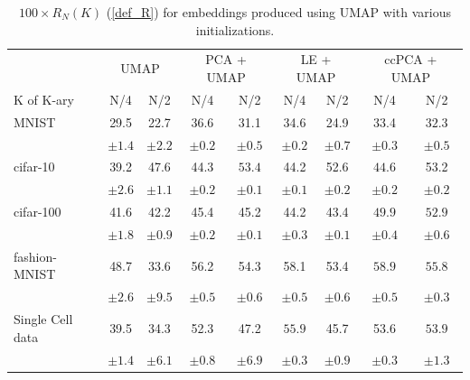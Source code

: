 \begin{table}[h]
\caption{$100 \times R_{N}(K)$ (\ref{def_R}) for embeddings produced using UMAP with various initializations.}
\begin{footnotesize}
\begin{center}
\begin{tabular}{lcccccccc}
\toprule
& \multicolumn{2}{c}{UMAP} & \multicolumn{2}{c}{PCA + UMAP} & \multicolumn{2}{c}{LE + UMAP} & \multicolumn{2}{c}{ccPCA + UMAP} \\
\cmidrule(lr){2-3}\cmidrule(lr){4-5}\cmidrule(lr){6-7}\cmidrule(lr){8-9}
K of K-ary & {N/4} & {N/2}  & {N/4} & {N/2} & {N/4} & {N/2} & {N/4} & {N/2} \\
\midrule
MNIST & 29.5 & 22.7 & $\bm{36.6}$ & 31.1 & 34.6 & 24.9 & 33.4 & $\bm{32.3}$ \\
& $\pm 1.4$ & $\pm 2.2$ & $\pm 0.2$ & $\pm 0.5$ & $\pm 0.2$ & $\pm 0.7$ & $\pm 0.3$ & $\pm 0.5$ 
\vspace{0.1cm}
\\
cifar-10 & 39.2 & 47.6 & 44.3 & $\bm{53.4}$ & 44.2 & 52.6 & $\bm{44.6}$ & 53.2\\
& $\pm 2.6$ & $\pm 1.1$ & $\pm 0.2$ & $\pm 0.1$ & $\pm 0.1$ & $\pm 0.2$ & $\pm 0.2$ & $\pm 0.2$ 
\vspace{0.1cm}
\\
cifar-100 & 41.6 & 42.2 & 45.4 & 45.2 & 44.2 & 43.4 & $\bm{49.9}$ & $\bm{52.9}$\\
& $\pm 1.8$ & $\pm 0.9$ & $\pm 0.2$ & $\pm 0.1$ & $\pm 0.3$ & $\pm 0.1$ & $\pm 0.4$ & $\pm 0.6$ 
\vspace{0.1cm}
\\
fashion-MNIST & 48.7 & 33.6 & 56.2 & 54.3 & 58.1 & 53.4 & $\bm{58.9}$ & $\bm{55.8}$ \\
& $\pm 2.6$ & $\pm 9.5$ & $\pm 0.5$ & $\pm 0.6$ & $\pm 0.5$ & $\pm 0.6$ & $\pm 0.5$ & $\pm 0.3$ 
\vspace{0.1cm}
\\
Single Cell data & 39.5 & 34.3 & 52.3 & 47.2 & $\bm{55.9}$ & 45.7 & 53.6 & $\bm{53.9}$\\
& $\pm 1.4$ & $\pm 6.1$ & $\pm 0.8$ & $\pm 6.9$ & $\pm 0.3$ & $\pm 0.9$ & $\pm 0.3$ & $\pm 1.3$ 
\\
\bottomrule
\end{tabular}
\end{center}
\end{footnotesize}
\label{UMAP_quantitative_results}
\end{table}

